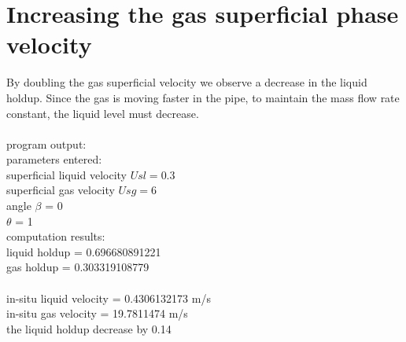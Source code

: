 \documentclass[10pt,a4paper]{report}
\begin{document}
\section{Increasing the gas superficial phase velocity}
By doubling the gas superficial velocity we observe a decrease in the liquid holdup. Since the gas is moving faster in the pipe, to maintain the mass flow rate constant, the liquid level must decrease. \\
\\
program output:\\
parameters entered:\\
superficial liquid velocity $Usl =  0.3$\\
superficial gas velocity $Usg    =  6$\\
angle $\beta$                      =  0\\
$\theta$                           =  1\\

computation results:\\
liquid holdup             = 0.696680891221\\
gas holdup                = 0.303319108779\\
\\
in-situ liquid velocity   = 0.4306132173 m/s\\
in-situ gas velocity      = 19.7811474 m/s\\

the liquid holdup decrease by 0.14
\end{document}
